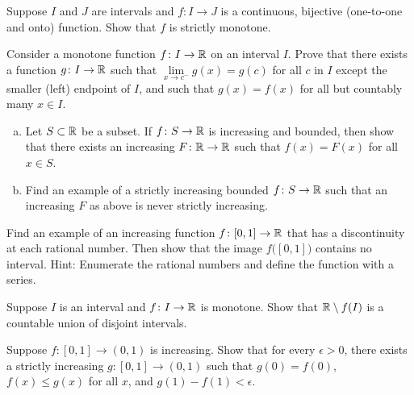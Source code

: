 \begin{exercise}
Suppose $I$ and $J$ are intervals and
$f \colon I \to J$ is a continuous, bijective (one-to-one and onto)
function.  Show that $f$ is strictly monotone.
\end{exercise}

\begin{exercise}
Consider a monotone function $f \colon I \to {\mathbb{R}}$ on an interval $I$.  Prove that there exists
a function $g \colon I \to {\mathbb{R}}$ such that
$\lim\limits_{x \to c^-} g(x) = g(c)$ for all $c$ in $I$ except the
smaller (left) endpoint of $I$, and such that
$g(x) = f(x)$ for all but countably many $x \in I$.
\end{exercise}

\begin{exercise}
\leavevmode
\begin{enumerate}[a)]
\item
Let $S \subset {\mathbb{R}}$ be a subset.  If $f \colon S \to {\mathbb{R}}$ is increasing and
bounded,
then show that there exists an increasing $F \colon {\mathbb{R}} \to {\mathbb{R}}$
such that $f(x) = F(x)$ for all $x \in S$.
\item
Find an example of a strictly increasing bounded $f \colon S \to {\mathbb{R}}$ such that
an increasing $F$ as above is never strictly increasing.
\end{enumerate}
\end{exercise}

\begin{exercise}[Challenging] \label{exercise:increasingfuncdiscatQ}
Find an example of an increasing function $f \colon [0,1] \to {\mathbb{R}}$
that has a discontinuity at each rational number.  Then show that the image
$f\bigl([0,1]\bigr)$ contains no interval.  Hint: Enumerate
the rational numbers and define
the function with a series.
\end{exercise}

\begin{exercise}
Suppose $I$ is an interval and $f \colon I \to {\mathbb{R}}$ is monotone.
Show that ${\mathbb{R}} \setminus f(I)$ is a countable union of disjoint intervals.
\end{exercise}

\begin{exercise}
Suppose $f \colon [0,1] \to (0,1)$ is increasing.  Show that for every
$\epsilon > 0$, there exists
a strictly increasing $g \colon [0,1] \to (0,1)$ such that
$g(0) = f(0)$, $f(x) \leq g(x)$ for all $x$, and $g(1)-f(1) < \epsilon$.
\end{exercise}

